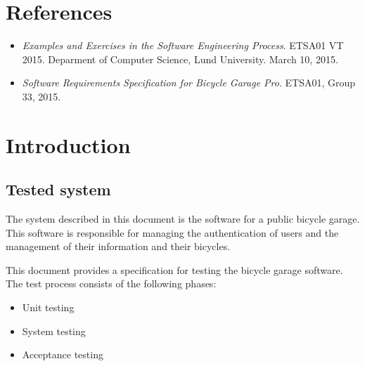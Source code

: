 \documentclass[12pt,titlepage]{article}
\begin{document}


\maketitle
\newpage
\tableofcontents
\thispagestyle{empty}
\setcounter{page}{0}
\newpage


\section{References}
\label{sec:references}

\begin{itemize}
	\item \textit{Examples and Exercises in the Software
		Engineering Process}. ETSA01 VT 2015. Deparment of Computer
		Science, Lund University. March 10, 2015.
	\item \textit{Software Requirements Specification for Bicycle Garage
		Pro}. ETSA01, Group 33, 2015.
\end{itemize}


\section{Introduction}
\label{sec:introduction}

\subsection{Tested system}
\label{subsec:tested-system}

The system described in this document is the software for a public bicycle
garage. This software is responsible for managing the authentication of users
and the management of their information and their bicycles.

This document provides a specification for testing the bicycle garage software.
The test process consists of the following phases:

\begin{itemize}
	\item Unit testing
	\item System testing
	\item Acceptance testing
\end{itemize}
\end{document}
